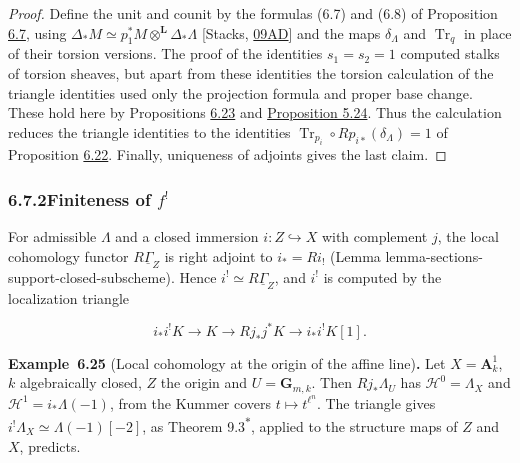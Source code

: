 \documentclass[11pt]{article}
\newenvironment{bpstatement}[2]{\par\addvspace{0.6\baselineskip}\noindent\textbf{#1}#2\textbf{.}\enspace\ignorespaces}
  {\par\addvspace{0.4\baselineskip}}
\newcommand{\bpout}[1]{#1\textsuperscript{\hyperlink{bp-outside}{\ensuremath{\ast}}}}
\begin{document}
\begin{proof}[{Proof}]\label{bp588}%
Define the unit and counit by the formulas (6.7) and (6.8) of Proposition \hyperref[bp534]{6.7}, using \(\Delta_*M\simeq p_1^*M\otimes^{\mathbf L}\Delta_*\Lambda\) [Stacks, \href{https://stacks.math.columbia.edu/tag/09AD}{09AD}] and the maps \(\delta_\Lambda\) and \(\operatorname{Tr}_q\) in place of their torsion versions. The proof of the identities \(s_1=s_2=1\) computed stalks of torsion sheaves, but apart from these identities the torsion calculation of the triangle identities used only the projection formula and proper base change. These hold here by Propositions \hyperref[bp584]{6.23} and \hyperref[bp488]{Proposition 5.24}. Thus the calculation reduces the triangle identities to the identities \(\operatorname{Tr}_{p_i}\circ Rp_{i*}(\delta_\Lambda)=1\) of Proposition \hyperref[bp581]{6.22}. Finally, uniqueness of adjoints gives the last claim.
\end{proof}


\subsubsection*{\texorpdfstring{6.7.2\quad Finiteness of $f^!$}{6.7.2 Finiteness of f!}}
\label{bp589}%
\label{bp590}%
For admissible \(\Lambda\) and a closed immersion \(i:Z\hookrightarrow X\) with complement \(j\), the local cohomology functor \(R\underline\Gamma_Z\) is right adjoint to \(i_*=Ri_!\) (Lemma lemma-sections-support-closed-subscheme). Hence \(i^!\simeq R\underline\Gamma_Z\), and \(i^!\) is computed by the localization triangle

\[
i_*i^!K\longrightarrow K\longrightarrow Rj_*j^*K
\longrightarrow i_*i^!K[1].
\]

\label{bp591}%
\begin{bpstatement}{Example~6.25}{ (Local cohomology at the origin of the affine line)}
Let \(X=\mathbf A^1_k\), \(k\) algebraically closed, \(Z\) the origin and \(U=\mathbf G_{m,k}\). Then \(Rj_*\Lambda_U\) has \(\mathcal H^0=\Lambda_X\) and \(\mathcal H^1=i_*\Lambda(-1)\), from the Kummer covers \(t\mapsto t^{\ell^n}\). The triangle gives \(i^!\Lambda_X\simeq\Lambda(-1)[-2]\), as Theorem \bpout{9.3}, applied to the structure maps of \(Z\) and \(X\), predicts.
\end{bpstatement}
\end{document}
